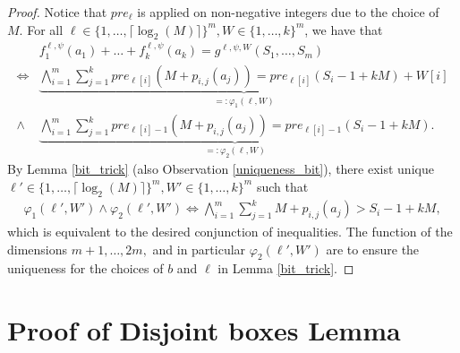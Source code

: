 \begin{proof}
     Notice that $pre_\ell$ is applied on non-negative integers due to the choice of $M.$
     For all $\ell \in \{1,\dots,\lceil \log_2(M) \rceil \}^m, W \in \{1,\dots,k\}^m$, we have that 
     \begin{align*}
       & f^{\ell,\psi}_1 (a_1)+\dots + f^{\ell,\psi}_k (a_k)=g^{\ell,\psi,W} (S_1,\dots,S_m) \\
       \iff &  \underbrace{\bigwedge_{i=1}^m \sum_{j=1}^{k} pre_{\ell[i]}(M+p_{i,j}( a_j))= pre_{\ell[i]}\left(S_i-1+ kM \right)+W[i]}_{=:\varphi_1(\ell,W)} \\
       \land & \underbrace{\bigwedge_{i=1}^m \sum_{j=1}^{k} pre_{\ell[i]-1}(M+p_{i,j}( a_j))= pre_{\ell[i]-1}\left(S_i-1+ kM \right)}_{=:\varphi_2(\ell,W)}.
     \end{align*}
     By Lemma \ref{bit_trick} (also Observation \ref{uniqueness_bit}), there exist unique $ \ell' \in \{1,\dots,\lceil \log_2(M) \rceil \}^m, W' \in \{1,\dots,k\}^m$ such that 
     \begin{align*}
       \varphi_1(\ell',W') \land \varphi_2(\ell',W')\iff \bigwedge_{i=1}^m\sum_{j=1}^{k} M+p_{i,j}(a_j) >S_i -1 + kM,
     \end{align*}
     which is equivalent to the desired conjunction of inequalities.
     The function of the dimensions $m+1,\dots,2m,$ and in particular $\varphi_2(\ell',W')$ are to ensure the uniqueness for the choices of $b$ and $\ell$ in Lemma \ref{bit_trick}.
   \end{proof}

\section{Proof of Disjoint boxes Lemma} \label{sec:disjointboxes}

